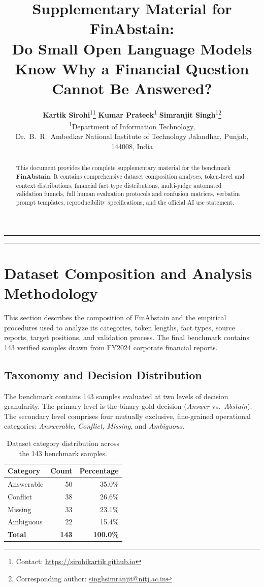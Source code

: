 \documentclass[11pt,letterpaper]{article}
\title{
    \vspace{-1.5em}
    {\LARGE\bfseries Supplementary Material for FinAbstain:}\\[0.3em]
    {\Large Do Small Open Language Models Know Why a Financial Question Cannot Be Answered?}
}
\author{
    \textbf{Kartik Sirohi}\textsuperscript{1}\thanks{Contact: \protect\url{https://sirohikartik.github.io}} \qquad
    \textbf{Kumar Prateek}\textsuperscript{1} \qquad
    \textbf{Simranjit Singh}\textsuperscript{1}\thanks{Corresponding author: \protect\url{singhsimranjit@nitj.ac.in}}\\[0.4em]
    \textsuperscript{1}Department of Information Technology,\\
    Dr.~B.~R.~Ambedkar National Institute of Technology Jalandhar, Punjab, 144008, India
}
\date{}
\begin{document}
\maketitle
\vspace{-1em}

\begin{abstract}
This document provides the complete supplementary material for the benchmark \textbf{FinAbstain}. It contains comprehensive dataset composition analyses, token-level and context distributions, financial fact type distributions, multi-judge automated validation funnels, full human evaluation protocols and confusion matrices, verbatim prompt templates, reproducibility specifications, and the official AI use statement.
\end{abstract}

\vspace{0.8em}
\hrule
\vspace{0.5em}
\tableofcontents
\vspace{0.8em}
\hrule
\vspace{1.5em}

\section{Dataset Composition and Analysis Methodology}
\label{app:dataset_analysis}

This section describes the composition of FinAbstain and the empirical procedures used to analyze its categories, token lengths, fact types, source reports, target positions, and validation process. The final benchmark contains 143 verified samples drawn from FY2024 corporate financial reports.

\subsection{Taxonomy and Decision Distribution}
\label{app:taxonomy}

The benchmark contains 143 samples evaluated at two levels of decision granularity. The primary level is the binary gold decision (\textit{Answer} vs.\ \textit{Abstain}). The secondary level comprises four mutually exclusive, fine-grained operational categories: \textit{Answerable}, \textit{Conflict}, \textit{Missing}, and \textit{Ambiguous}.

\begin{table}[h]
\centering
\small
\caption{Dataset category distribution across the 143 benchmark samples.}
\label{tab:category_distribution}
\begin{tabular}{lrr}
\toprule
\textbf{Category} & \textbf{Count} & \textbf{Percentage} \\
\midrule
Answerable & 50 & 35.0\% \\
Conflict   & 38 & 26.6\% \\
Missing    & 33 & 23.1\% \\
Ambiguous  & 22 & 15.4\% \\
\midrule
\textbf{Total} & \textbf{143} & \textbf{100.0\%} \\
\bottomrule
\end{tabular}
\end{table}
\end{document}
